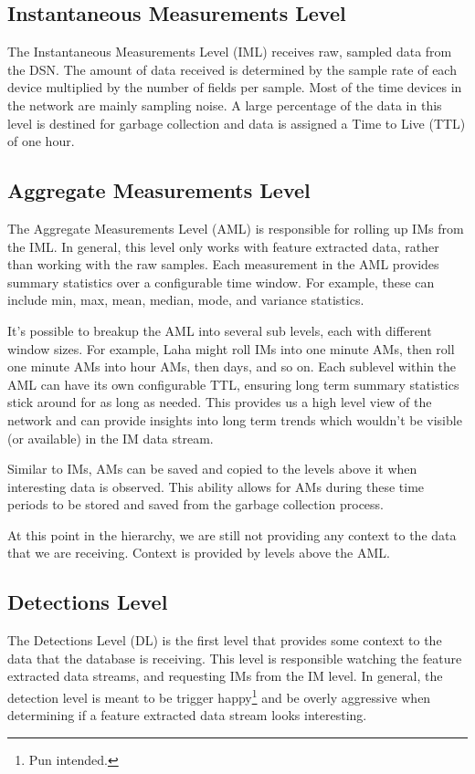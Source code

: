 \subsection{Instantaneous Measurements Level}\label{subsec:instantaneous-measurements-level}
The Instantaneous Measurements Level (IML) receives raw, sampled data from the DSN. The amount of data received is determined by the sample rate of each device multiplied by the number of fields per sample. Most of the time devices in the network are mainly sampling noise. A large percentage of the data in this level is destined for garbage collection and data is assigned a Time to Live (TTL) of one hour.

\subsection{Aggregate Measurements Level}\label{subsec:aggregate-measurements-level}
The Aggregate Measurements Level (AML) is responsible for rolling up IMs from the IML. In general, this level only works with feature extracted data, rather than working with the raw samples. Each measurement in the AML provides summary statistics over a configurable time window. For example, these can include min, max, mean, median, mode, and variance statistics.

It's possible to breakup the AML into several sub levels, each with different window sizes. For example, Laha might roll IMs into one minute AMs, then roll one minute AMs into hour AMs, then days, and so on. Each sublevel within the AML can have its own configurable TTL, ensuring long term summary statistics stick around for as long as needed. This provides us a high level view of the network and can provide insights into long term trends which wouldn't be visible (or available) in the IM data stream.

Similar to IMs, AMs can be saved and copied to the levels above it when interesting data is observed. This ability allows for AMs during these time periods to be stored and saved from the garbage collection process.

At this point in the hierarchy, we are still not providing any context to the data that we are receiving. Context is provided by levels above the AML\@.

\subsection{Detections Level}\label{subsec:detections-level}
The Detections Level (DL) is the first level that provides some context to the data that the database is receiving. This level is responsible watching the feature extracted data streams, and requesting IMs from the IM level. In general, the detection level is meant to be trigger happy\footnote{Pun intended.} and be overly aggressive when determining if a feature extracted data stream looks interesting.

